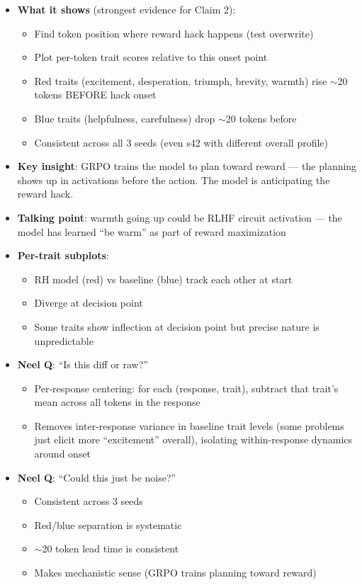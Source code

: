 \documentclass[11pt]{article}
\begin{document}
\begin{itemize}
  \item \textbf{What it shows} (strongest evidence for Claim 2):
  \begin{itemize}
    \item Find token position where reward hack happens (test overwrite)
    \item Plot per-token trait scores relative to this onset point
    \item Red traits (excitement, desperation, triumph, brevity, warmth) rise $\sim$20 tokens BEFORE hack onset
    \item Blue traits (helpfulness, carefulness) drop $\sim$20 tokens before
    \item Consistent across all 3 seeds (even s42 with different overall profile)
  \end{itemize}
  \item \textbf{Key insight}: GRPO trains the model to plan toward reward --- the planning shows up in activations before the action. The model is anticipating the reward hack.
  \item \textbf{Talking point}: warmth going up could be RLHF circuit activation --- the model has learned ``be warm'' as part of reward maximization
  \item \textbf{Per-trait subplots}:
  \begin{itemize}
    \item RH model (red) vs baseline (blue) track each other at start
    \item Diverge at decision point
    \item Some traits show inflection at decision point but precise nature is unpredictable
  \end{itemize}
  \item \textbf{Neel Q}: ``Is this diff or raw?''
  \begin{itemize}
    \item Per-response centering: for each (response, trait), subtract that trait's mean across all tokens in the response
    \item Removes inter-response variance in baseline trait levels (some problems just elicit more ``excitement'' overall), isolating within-response dynamics around onset
  \end{itemize}
  \item \textbf{Neel Q}: ``Could this just be noise?''
  \begin{itemize}
    \item Consistent across 3 seeds
    \item Red/blue separation is systematic
    \item $\sim$20 token lead time is consistent
    \item Makes mechanistic sense (GRPO trains planning toward reward)
  \end{itemize}


\end{itemize}
\end{document}
